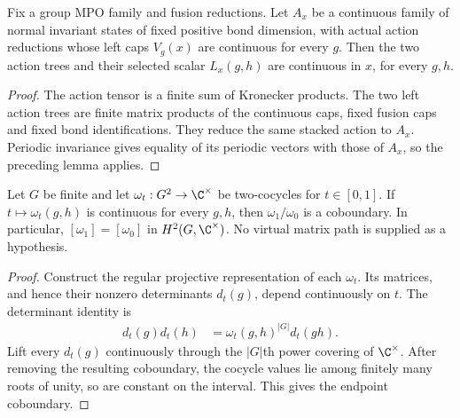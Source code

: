 \begin{lemma}
    \label{lem:mpug_action_l_continuity}
    \leanok
    Fix a group MPO family and fusion reductions. Let $A_x$ be a continuous
    family of normal invariant states of fixed positive bond dimension,
    with actual action reductions whose left caps $V_g(x)$ are continuous
    for every $g$. Then the two action trees and their selected scalar
    $L_x(g,h)$ are continuous in $x$, for every $g,h$.
\end{lemma}
\begin{proof}\leanok
    The action tensor is a finite sum of Kronecker products. The two left
    action trees are finite matrix products of the continuous caps, fixed
    fusion caps and fixed bond identifications. They reduce the same
    stacked action to $A_x$. Periodic invariance gives equality of its
    periodic vectors with those of $A_x$, so the preceding lemma applies.
\end{proof}

\begin{lemma}
    \label{lem:mpug_finite_cocycle_path}
    \leanok
    Let $G$ be finite and let $\omega_t:G^2\to\C^\times$ be two-cocycles
    for $t\in[0,1]$. If $t\mapsto\omega_t(g,h)$ is continuous for every
    $g,h$, then $\omega_1/\omega_0$ is a coboundary. In particular,
    $[\omega_1]=[\omega_0]$ in $H^2(G,\C^\times)$. No virtual matrix path
    is supplied as a hypothesis.
\end{lemma}
\begin{proof}\leanok
    Construct the regular projective representation of each $\omega_t$.
    Its matrices, and hence their nonzero determinants $d_t(g)$, depend
    continuously on $t$. The determinant identity is
    \begin{align}
        d_t(g)d_t(h) & =\omega_t(g,h)^{|G|}d_t(gh).
    \end{align}
    Lift every $d_t(g)$ continuously through the $|G|$th power covering
    of $\C^\times$. After removing the resulting coboundary, the cocycle
    values lie among finitely many roots of unity, so are constant on
    the interval. This gives the endpoint coboundary.
\end{proof}

